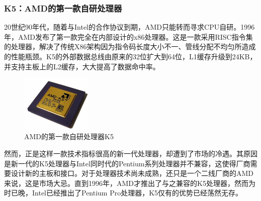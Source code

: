 \documentclass[UTF8]{ctexart}
\begin{document}
\subsubsection{K5：AMD的第一款自研处理器}
20世纪90年代，随着与Intel的合作协议到期，AMD只能转而寻求CPU自研。1996年，AMD发布了第一款完全在内部设计的x86处理器。这是一款采用RISC指令集的处理器，解决了传统X86架构因为指令码长度大小不一、管线分配不均匀所造成的性能瓶颈。K5的外部数据总线由原来的32位扩大到64位，L1缓存升级到24KB，并支持主板上的L2缓存，大大提高了数据命中率。
\begin{figure}[H]
    \begin{center}
        \includegraphics[width=0.3\textwidth]{figure/K5.jpg}
        \caption{AMD的第一款自研处理器K5}
    \end{center}
\end{figure}
然而，正是这样一款技术指标很高的新一代处理器，却遭到了市场的冷遇。其原因是新一代的K5处理器与Intel同时代的Pentium系列处理器并不兼容，这使得厂商需要设计新的主板和接口。对于处理器技术尚未成熟，还只是一个二线厂商的AMD来说，这是市场大忌。直到1996年，AMD才推出了与之兼容的K5处理器，然而为时已晚，Intel已经推出了Pentium Pro处理器，K5仅有的优势已经荡然无存。
\end{document}
